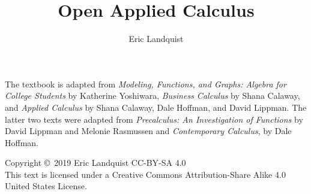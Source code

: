 \documentclass{book}
\newcommand{\<}{\left\langle}
\renewcommand{\>}{\right\rangle}
\theoremstyle{definition}
\begin{document}

\title{Open Applied Calculus}
\author{Eric Landquist}
\maketitle


\thispagestyle{empty}
The textbook is adapted from {\em Modeling, Functions, and Graphs: Algebra for College Students} by Katherine Yoshiwara, {\em Business Calculus} by Shana Calaway, and {\em Applied Calculus} by Shana Calaway, Dale Hoffman, and David Lippman. The latter two texts were adapted from {\em Precalculus: An Investigation of Functions} by David Lippman and Melonie Rasmussen and {\em Contemporary Calculus}, by Dale Hoffman.

\noindent Copyright \copyright\ 2019 Eric Landquist CC-BY-SA 4.0\\ %

\noindent This text is licensed under a Creative Commons Attribution-Share Alike 4.0 United
States License.\\
\end{document}
